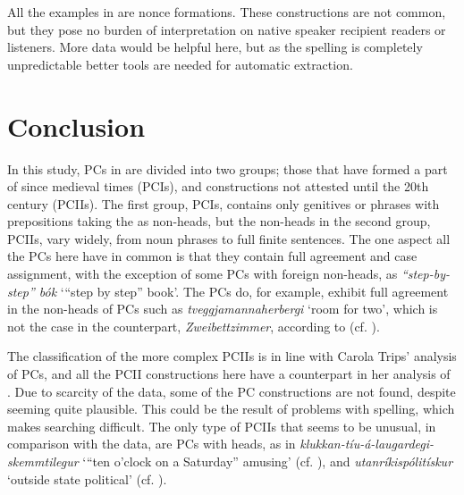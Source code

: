 \documentclass[output=paper]{LSP/langsci}
\begin{document}
\begin{xlist}
All the examples in  are nonce formations. These constructions are not common, but they pose no burden of interpretation on native speaker recipient readers or listeners. More data would be helpful here, but as the spelling is completely unpredictable better tools are needed for automatic extraction.

\section{Conclusion} 

In this study, PCs in  are divided into two groups; those that have formed a part of  since medieval times (PCIs), and constructions not attested until the 20th century (PCIIs). The first group, PCIs, contains only genitives or  phrases with prepositions taking the  as non-heads, but the non-heads in the second group, PCIIs, vary widely, from noun phrases to full finite sentences. The one aspect all the PCs here have in common is that they contain full agreement and case assignment, with the exception of some PCs with foreign non-heads, as \textit{“step-by-step” bók} ‘“step by step” book’. The  PCs do, for example, exhibit full  agreement in the non-heads of PCs such as \textit{tveggjamannaherbergi} ‘room for two’, which is not the case in the  counterpart, \textit{Zweibettzimmer}, according to \citet{Pafel2015} (cf. ).

The classification of the more complex PCIIs is in line with Carola Trips’ analysis of  PCs, and all the PCII constructions here have a counterpart in her analysis of . Due to scarcity of the  data, some of the  PC constructions are not found, despite seeming quite plausible. This could be the result of problems with spelling, which makes searching difficult. The only type of  PCIIs that seems to be unusual, in comparison with the  data, are PCs with  heads, as in \textit{klukkan-tíu-á-laugardegi-skemmtilegur} ‘“ten o’clock on a Saturday” amusing’ (cf. ), and \textit{utanríkispólitískur} ‘outside state political’ (cf. ).


\end{xlist}
\end{document}
